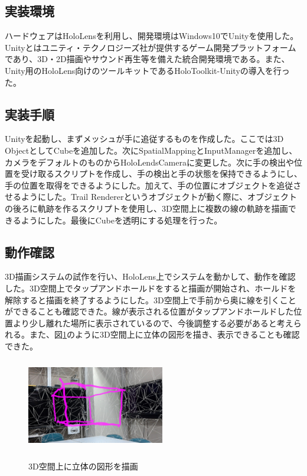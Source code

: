 \documentclass{hissymp}
\begin{document}
\subsection{実装環境}
ハードウェアはHoloLensを利用し、開発環境はWindows10でUnity\cite{tex9}を使用した。Unityとはユニティ・テクノロジーズ社が提供するゲーム開発プラットフォームであり、3D・2D描画やサウンド再生等を備えた統合開発環境である。また、Unity用のHoloLens向けのツールキットであるHoloToolkit-Unityの導入を行った。

\subsection{実装手順}
Unityを起動し、まずメッシュが手に追従するものを作成した。ここでは3D ObjectとしてCubeを追加した。次にSpatialMappingとInputManagerを追加し、カメラをデフォルトのものからHoloLendsCameraに変更した。次に手の検出や位置を受け取るスクリプトを作成し、手の検出と手の状態を保持できるようにし、手の位置を取得をできるようにした。加えて、手の位置にオブジェクトを追従させるようにした。Trail Renderer\cite{tex10}というオブジェクトが動く際に、オブジェクトの後ろに軌跡を作るスクリプトを使用し、3D空間上に複数の線の軌跡を描画できるようにした。最後にCubeを透明にする処理を行った。

\subsection{動作確認}
3D描画システムの試作を行い、HoloLens上でシステムを動かして、動作を確認した。3D空間上でタップアンドホールドをすると描画が開始され、ホールドを解除すると描画を終了するようにした。3D空間上で手前から奥に線を引くことができることも確認できた。線が表示される位置がタップアンドホールドした位置より少し離れた場所に表示されているので、今後調整する必要があると考えられる。また、図\ref{fig:rittai}のように3D空間上に立体の図形を描き、表示できることも確認できた。

\begin{figure}[h]
  \begin{center}
    \includegraphics[clip,height=4.0cm,width=6.0cm]{./rittai.eps}
    \caption{3D空間上に立体の図形を描画}
    \label{fig:rittai}
  \end{center}
\end{figure}
\end{document}
